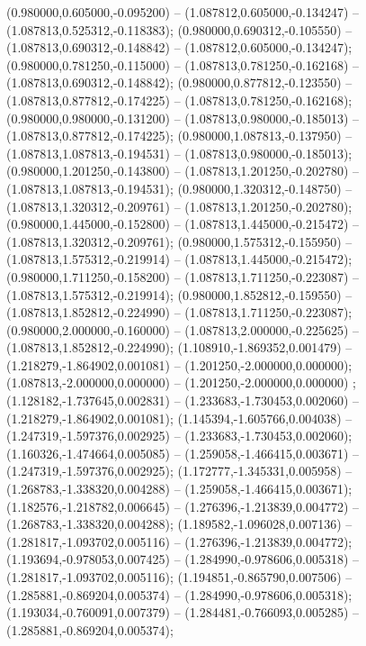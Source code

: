  (0.980000,0.605000,-0.095200) -- (1.087812,0.605000,-0.134247) -- (1.087813,0.525312,-0.118383);
 (0.980000,0.690312,-0.105550) -- (1.087813,0.690312,-0.148842) -- (1.087812,0.605000,-0.134247);
 (0.980000,0.781250,-0.115000) -- (1.087813,0.781250,-0.162168) -- (1.087813,0.690312,-0.148842);
 (0.980000,0.877812,-0.123550) -- (1.087813,0.877812,-0.174225) -- (1.087813,0.781250,-0.162168);
 (0.980000,0.980000,-0.131200) -- (1.087813,0.980000,-0.185013) -- (1.087813,0.877812,-0.174225);
 (0.980000,1.087813,-0.137950) -- (1.087813,1.087813,-0.194531) -- (1.087813,0.980000,-0.185013);
 (0.980000,1.201250,-0.143800) -- (1.087813,1.201250,-0.202780) -- (1.087813,1.087813,-0.194531);
 (0.980000,1.320312,-0.148750) -- (1.087813,1.320312,-0.209761) -- (1.087813,1.201250,-0.202780);
 (0.980000,1.445000,-0.152800) -- (1.087813,1.445000,-0.215472) -- (1.087813,1.320312,-0.209761);
 (0.980000,1.575312,-0.155950) -- (1.087813,1.575312,-0.219914) -- (1.087813,1.445000,-0.215472);
 (0.980000,1.711250,-0.158200) -- (1.087813,1.711250,-0.223087) -- (1.087813,1.575312,-0.219914);
 (0.980000,1.852812,-0.159550) -- (1.087813,1.852812,-0.224990) -- (1.087813,1.711250,-0.223087);
 (0.980000,2.000000,-0.160000) -- (1.087813,2.000000,-0.225625) -- (1.087813,1.852812,-0.224990);
 (1.108910,-1.869352,0.001479) -- (1.218279,-1.864902,0.001081) -- (1.201250,-2.000000,0.000000);
 (1.087813,-2.000000,0.000000) -- (1.201250,-2.000000,0.000000) ;
 (1.128182,-1.737645,0.002831) -- (1.233683,-1.730453,0.002060) -- (1.218279,-1.864902,0.001081);
 (1.145394,-1.605766,0.004038) -- (1.247319,-1.597376,0.002925) -- (1.233683,-1.730453,0.002060);
 (1.160326,-1.474664,0.005085) -- (1.259058,-1.466415,0.003671) -- (1.247319,-1.597376,0.002925);
 (1.172777,-1.345331,0.005958) -- (1.268783,-1.338320,0.004288) -- (1.259058,-1.466415,0.003671);
 (1.182576,-1.218782,0.006645) -- (1.276396,-1.213839,0.004772) -- (1.268783,-1.338320,0.004288);
 (1.189582,-1.096028,0.007136) -- (1.281817,-1.093702,0.005116) -- (1.276396,-1.213839,0.004772);
 (1.193694,-0.978053,0.007425) -- (1.284990,-0.978606,0.005318) -- (1.281817,-1.093702,0.005116);
 (1.194851,-0.865790,0.007506) -- (1.285881,-0.869204,0.005374) -- (1.284990,-0.978606,0.005318);
 (1.193034,-0.760091,0.007379) -- (1.284481,-0.766093,0.005285) -- (1.285881,-0.869204,0.005374);
